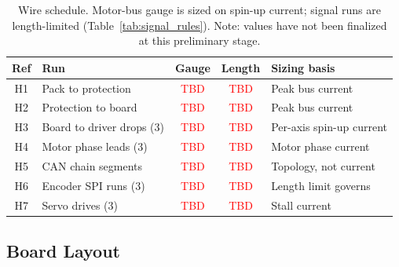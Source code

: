 \begin{table}[htbp]
\centering
\caption[Wire schedule]{Wire schedule. Motor-bus gauge is sized on spin-up current; signal runs
are length-limited (Table~\ref{tab:signal_rules}). Note: values have not been finalized at this preliminary stage. }
\label{tab:wire_schedule}
\small
\setlength{\tabcolsep}{4pt}
\begin{tabular}{c L{3.4cm} c c L{3.8cm}}
\toprule
Ref & Run & Gauge & Length & Sizing basis \\
\midrule
H1 & Pack to protection      & \textcolor{red}{TBD} & \textcolor{red}{TBD} & Peak bus current \\
H2 & Protection to board     & \textcolor{red}{TBD} & \textcolor{red}{TBD} & Peak bus current \\
H3 & Board to driver drops (3) & \textcolor{red}{TBD} & \textcolor{red}{TBD} & Per-axis spin-up current \\
H4 & Motor phase leads (3)   & \textcolor{red}{TBD} & \textcolor{red}{TBD} & Motor phase current \\
H5 & CAN chain segments      & \textcolor{red}{TBD} & \textcolor{red}{TBD} & Topology, not current \\
H6 & Encoder SPI runs (3)    & \textcolor{red}{TBD} & \textcolor{red}{TBD} & Length limit governs \\
H7 & Servo drives (3)        & \textcolor{red}{TBD} & \textcolor{red}{TBD} & Stall current \\
\bottomrule
\end{tabular}
\end{table}


\subsection{Board Layout}
\label{app:board_layout}



